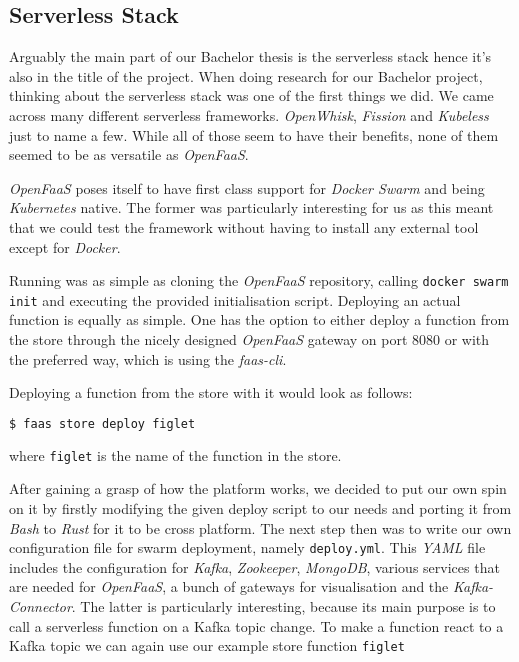 \subsection{Serverless Stack}

Arguably the main part of our Bachelor thesis is the serverless stack hence it's also in the title
of the project. When doing research for our Bachelor project, thinking about the serverless stack
was one of the first things we did. We came across many different serverless frameworks.
\textit{OpenWhisk}, \textit{Fission} and \textit{Kubeless} just to name a few. While all of those
seem to have their benefits, none of them seemed to be as versatile as \textit{OpenFaaS}.

\textit{OpenFaaS} poses itself to have first class support for \textit{Docker Swarm} and being
\textit{Kubernetes} native. The former was particularly interesting for us as this meant that we
could test the framework without having to install any external tool except for  \textit{Docker}.

Running was as simple as cloning the \textit{OpenFaaS} repository, calling \texttt{docker swarm
init} and executing the provided initialisation script. Deploying an actual function is equally as
simple. One has the option to either deploy a function from the store through the nicely designed
\textit{OpenFaaS} gateway on port 8080 or with the preferred way, which is using the
\textit{faas-cli}.

Deploying a function from the store with it would look as follows:

\begin{lstlisting}[language=bash]
  $ faas store deploy figlet
\end{lstlisting}

where \texttt{figlet} is the name of the function in the store.

After gaining a grasp of how the platform works, we decided to put our own spin on it by firstly
modifying the given deploy script to our needs and porting it from \textit{Bash} to \textit{Rust}
for it to be cross platform. The next step then was to write our own configuration file for swarm
deployment, namely \texttt{deploy.yml}. This \textit{YAML} file includes the configuration for
\textit{Kafka}, \textit{Zookeeper}, \textit{MongoDB}, various services that are needed for
\textit{OpenFaaS}, a bunch of gateways for visualisation and the \textit{Kafka-Connector}. The
latter is particularly interesting, because its main purpose is to call a serverless function on a
Kafka topic change. To make a function react to a Kafka topic we can again use our example store
function \texttt{figlet}

